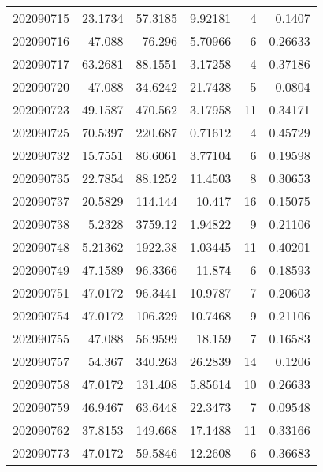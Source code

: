 \begin{tabular}{rrrrrr}
 202090715 &         23.1734  &       57.3185 &            9.92181 &           4 & 0.1407  \\
 202090716 &         47.088   &       76.296  &            5.70966 &           6 & 0.26633 \\
 202090717 &         63.2681  &       88.1551 &            3.17258 &           4 & 0.37186 \\
 202090720 &         47.088   &       34.6242 &           21.7438  &           5 & 0.0804  \\
 202090723 &         49.1587  &      470.562  &            3.17958 &          11 & 0.34171 \\
 202090725 &         70.5397  &      220.687  &            0.71612 &           4 & 0.45729 \\
 202090732 &         15.7551  &       86.6061 &            3.77104 &           6 & 0.19598 \\
 202090735 &         22.7854  &       88.1252 &           11.4503  &           8 & 0.30653 \\
 202090737 &         20.5829  &      114.144  &           10.417   &          16 & 0.15075 \\
 202090738 &          5.2328  &     3759.12   &            1.94822 &           9 & 0.21106 \\
 202090748 &          5.21362 &     1922.38   &            1.03445 &          11 & 0.40201 \\
 202090749 &         47.1589  &       96.3366 &           11.874   &           6 & 0.18593 \\
 202090751 &         47.0172  &       96.3441 &           10.9787  &           7 & 0.20603 \\
 202090754 &         47.0172  &      106.329  &           10.7468  &           9 & 0.21106 \\
 202090755 &         47.088   &       56.9599 &           18.159   &           7 & 0.16583 \\
 202090757 &         54.367   &      340.263  &           26.2839  &          14 & 0.1206  \\
 202090758 &         47.0172  &      131.408  &            5.85614 &          10 & 0.26633 \\
 202090759 &         46.9467  &       63.6448 &           22.3473  &           7 & 0.09548 \\
 202090762 &         37.8153  &      149.668  &           17.1488  &          11 & 0.33166 \\
 202090773 &         47.0172  &       59.5846 &           12.2608  &           6 & 0.36683 \\

\end{tabular}
